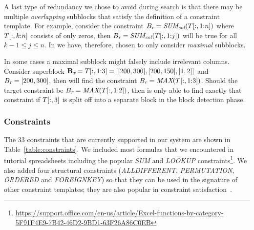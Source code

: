 A last type of redundancy we chose to avoid during search is that there may be multiple \textit{overlapping} subblocks that satisfy the definition of a constraint template.
For example, consider the constraint $B_{\textit{r}} = \textit{SUM\textsubscript{col}}(T[:,1{:}n])$ where $T[:,k{:}n]$ consists of only zeros, then $B_{\textit{r}} = \textit{SUM\textsubscript{col}}(T[:,1{:}j])$ will be true for all $k - 1 \leq j \leq n$.
In \sname we have, therefore, chosen to only consider \textit{maximal} subblocks.

In some cases a maximal subblock might falsely include irrelevant columns.
Consider superblock $\mathbf{B_{\textit{x}}} = T[:,1{:}3] = [[200, 300], [200, 150], [1, 2]]$ and $B_{\textit{r}} = [200, 300]$, then \sname will find the constraint $B_{\textit{r}} = \textit{MAX}(T[:,1{:}3])$.
Should the target constraint be $B_{\textit{r}} = \textit{MAX}(T[:,1{:}2])$, then \sname is only able to find exactly that constraint if $T[:,3]$ is split off into a separate block in the block detection phase.






\subsubsection{Constraints} \label{sec:which_cons}
The 33 constraints that are currently supported in our system are shown in Table~\ref{table:constraints}.
We included most formulas that we encountered in tutorial spreadsheets including the popular \textit{SUM} and \textit{LOOKUP} constraints\footnote{\href{https://support.office.com/en-us/article/Excel-functions-by-category-5F91F4E9-7B42-46D2-9BD1-63F26A86C0EB}{https://support.office.com/en-us/article/Excel-functions-by-category-5F91F4E9-7B42-46D2-9BD1-63F26A86C0EB}}.
We also added four structural constraints (\textit{ALLDIFFERENT}, \textit{PERMUTATION}, \textit{ORDERED} and \textit{FOREIGNKEY}) so that they can be used in the signature of other constraint templates; they are also popular in constraint satisfaction~\cite{modelseeker}.

